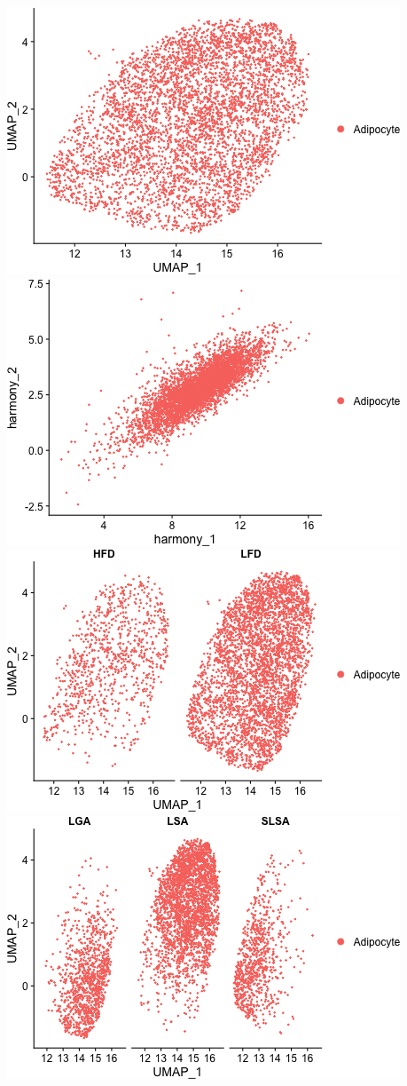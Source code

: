 \documentclass[]{article}
\begin{document}
\includegraphics{figures/GSE160729-clustering-1.png}
\includegraphics{figures/GSE160729-clustering-2.png}
\includegraphics{figures/GSE160729-clustering-3.png}
\includegraphics{figures/GSE160729-clustering-4.png}
\end{document}
